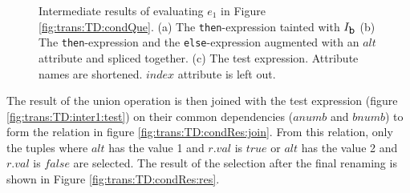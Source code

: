 \begin{myExample}
\begin{figure}[h]
\centering
{}
\phantom{A}
\phantom{A}
\caption[Intermediate results of evaluating $e_1$ in Figure \ref{fig:trans:TD:condQue}.]{Intermediate results of
evaluating $e_1$ in Figure \ref{fig:trans:TD:condQue}. (a) The
\texttt{then}-expression tainted with $I_{\mbox{\texttt{b}}}$ (b) The \texttt{then}-expression and the \texttt{else}-expression augmented with an $alt$ attribute and spliced together. (c) The test expression.
Attribute names are shortened. $index$ attribute is left out. \label{fig:trans:TD:inter1}}
\end{figure}

The result of the \textsf{union} operation is then joined with the test expression (figure
\ref{fig:trans:TD:inter1:test}) on their common dependencies ($anumb$ and $bnumb$) to form the relation in figure
\ref{fig:trans:TD:condRes:join}. From this relation, only the tuples where $alt$ has the value 1 and $r.val$ is
$true$ or $alt$ has the value 2 and $r.val$ is $false$ are selected. The result of the selection after the final
renaming is shown in Figure \ref{fig:trans:TD:condRes:res}.


\end{myExample}

